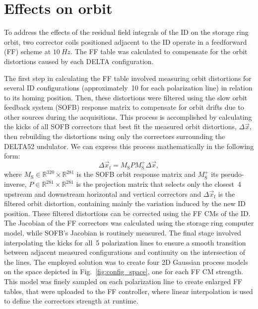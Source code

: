 \documentclass[a4paper,
               keeplastbox,   %
               ]{jacow}
\begin{document}
\section{Effects on orbit}

To address the effects of the residual field integrals of the ID on the storage ring orbit, two corrector coils positioned adjacent to the ID operate in a feedforward (FF) scheme at $\SI{10}{Hz}$. The FF table was calculated to compensate for the orbit distortions caused by each DELTA configuration.

The first step in calculating the FF table involved measuring orbit distortions for several ID configurations (approximately~\num{10} for each polarization line) in relation to its homing position. Then, these distortions were filtered using the slow orbit feedback system (SOFB) response matrix to compensate for orbit drifts due to other sources during the acquisitions. This process is accomplished by calculating the kicks of all SOFB correctors that best fit the measured orbit distortions, $\Delta\vec{x}$, then rebuilding the distortions using only the correctors surrounding the DELTA52 undulator. We can express this process mathematically in the following form:
\begin{equation}
    \Delta\vec{x}_\mathrm{f} = M_{\text{S}} P M_{\text{S}}^+\Delta\vec{x},
\end{equation}
where $M_\text{S} \in \mathbb{R}^{320}\times\mathbb{R}^{281}$ is the SOFB orbit response matrix and $M_{\text{S}}^+$ its pseudo-inverse, $P \in \mathbb{R}^{281}\times\mathbb{R}^{281}$ is the projection matrix that selects only the closest~\num{4} upstream and downstream horizontal and vertical correctors and $\Delta\vec{x}_\mathrm{f}$ is the filtered orbit distortion, containing mainly the variation induced by the new ID position. These filtered distortions can be corrected using the FF CMs of the ID. The Jacobian of the FF correctors was calculated using the storage ring computer model, while  SOFB's Jacobian is routinely measured. The final stage involved interpolating the kicks for all~\num{5} polarization lines to ensure a smooth transition between adjacent measured configurations and continuity on the intersection of the lines. The employed solution was to create four 2D Gaussian process models~\cite{Gaussian} on the space depicted in Fig.~\ref{fig:config_space}, one for each FF CM strength. This model was finely sampled on each polarization line to create enlarged FF tables, that were uploaded to the FF controller, where linear interpolation is used to define the correctors strength at runtime.
\end{document}
